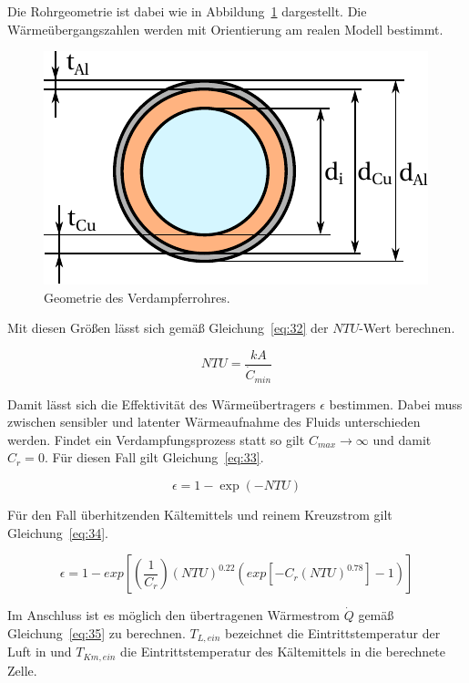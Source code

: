 Die Rohrgeometrie ist dabei wie in Abbildung~\ref{fig:Geometrie} dargestellt.
Die Wärmeübergangszahlen werden mit Orientierung am realen Modell bestimmt.

\begin{figure}[h]
\centering
\includegraphics[scale=1]{Pictures/Rohrgeometrie.pdf}
\caption{Geometrie des Verdampferrohres.}
\label{fig:Geometrie}
\end{figure}

Mit diesen Größen lässt sich gemäß Gleichung~\ref{eq:32} der $NTU$-Wert berechnen.

\begin{equation}
\label{eq:32}
NTU = \frac{kA}{\dot{C}_{min}}
\end{equation}

Damit lässt sich die Effektivität des Wärmeübertragers $\epsilon$ bestimmen.
Dabei muss zwischen sensibler und latenter Wärmeaufnahme des Fluids unterschieden werden.
Findet ein Verdampfungsprozess statt so gilt $C_{max}\longrightarrow\infty$ und damit $C_r =0$. Für diesen Fall gilt Gleichung~\ref{eq:33}.

\begin{equation}
\label{eq:33}
\epsilon = 1- \exp{(-NTU)}
\end{equation}

Für den Fall überhitzenden Kältemittels und reinem Kreuzstrom gilt Gleichung~\ref{eq:34}.

\begin{equation}
\label{eq:34}
\epsilon = 1- exp{\left[\left(\frac{1}{C_r}\right)(NTU)^{0.22}(exp{[-C_r(NTU)^{0.78}]}-1)\right]}
\end{equation}

Im Anschluss ist es  möglich den übertragenen Wärmestrom $\dot{Q}$ gemäß Gleichung~\ref{eq:35} zu berechnen. $T_{L,ein}$ bezeichnet die Eintrittstemperatur der Luft in und $T_{Km,ein}$ die Eintrittstemperatur des Kältemittels in die berechnete Zelle.

